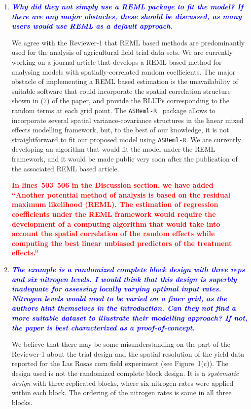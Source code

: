 \documentclass[a4paper]{article}   	%
\newcommand{\asreml}{\texttt{ASReml-R}}
\newcommand{\qtitle}[1]{\textit{\textbf{#1}}}
\begin{document}
\begin{enumerate}
    \item \qtitle{\textcolor{blue}{Why did they not simply use a REML package to fit the model? If there are any major obstacles, these should be discussed, as many users would use REML as a default approach.}}
    
     We agree with the Reviewer-1 that REML based methods are predominantly used for the analysis of agricultural field trial data sets. We are currently working on a journal article that develops a REML based method for analysing models with spatially-correlated random coefficients. The major obstacle of implementing a REML based estimation is the unavailability of suitable software that could incorporate the spatial correlation structure shown in (7) of the paper, and provide the BLUPs corresponding to the random terms at each grid point. The \asreml  ~ package allows to incorporate several spatial variance-covariance structures in the linear mixed effects modelling framework, but, to the best of our knowledge, it is not straightforward to fit our proposed model using \asreml. We are currently developing an algorithm that would fit the model under the REML framework, and it would be made public very soon after the publication of the associated REML based article.
     
    \textcolor{red}{\textbf{In lines~503--506 in the Discussion section, we have added ``Another potential method of analysis is based on the residual maximum likelihood (REML). The estimation of regression coefficients under the REML framework would require the development of a computing algorithm that would take into account the spatial correlation of the random effects while computing the best linear unbiased predictors of the treatment effects.''}}
    
   
    
    \item \qtitle{\textcolor{blue}{The example is a randomized complete block design with three reps and six nitrogen levels. I would think that this design is superbly inadequate for assessing locally varying optimal input rates. Nitrogen levels would need to be varied on a finer grid, as the authors hint themselves in the introduction. Can they not find a more suitable dataset to illustrate their modelling approach? If not, the paper is best characterized as a proof-of-concept.}}
    
    We believe that there may be some misunderstanding on the part of the Reviewer-1 about the trial design and the spatial resolution of the yield data reported for the Las Rosas corn field experiment (see Figure~1(c)). The design used is not the randomized complete block design. It is a \emph{systematic design} with three replicated blocks, where six nitrogen rates were applied within each block. The ordering of the nitrogen rates is same in all three blocks. 
    

\end{enumerate}
\end{document}
